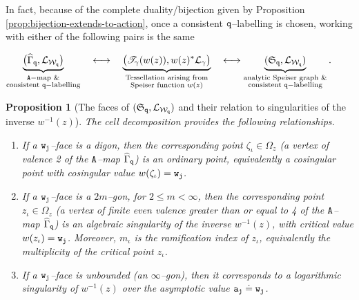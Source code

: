 \documentclass[final,3p,times]{elsarticle}
\newtheorem{proposition}[theorem]{Proposition}
\theoremstyle{definition}
\begin{document}
In fact, because of the complete duality/bijection 
given by Proposition \ref{prop:bijection-extends-to-action},
once a consistent $\tt q$--labelling is chosen, working with either of the following  pairs is the same

\centerline{$
\underbrace{
\big( %
\widehat{\Gamma}_{\tt q}, %
\mathcal{L}_{\mathcal{W}_{\tt q}} \big) 
}_{\substack{ \tt A-\text{map \&} \\ 
\text{consistent }{\tt q}-\text{labelling} } } 
\quad
\longleftrightarrow 
\quad
\underbrace{
\big( \mathscr{T}_\gamma(w(z)), 
w(z)^*\mathcal{L}_\gamma \big)
}_{\substack{ \text{Tessellation arising from} \\
\text{Speiser function } w(z) }}
\quad
\longleftrightarrow 
\underbrace{
(\mathfrak{S}_{\tt q}, \mathcal{L}_{\mathcal{W}_{\tt q}} ) 
}_{\substack{ \text{analytic Speiser graph } \& \\
\text{consistent }{\tt q}-\text{labelling} } } .
$}


\begin{proposition}[The faces of  
$(\mathfrak{S}_{\tt q}, \mathcal{L}_{\mathcal{W}_{\tt q}} )$ 
and 
their relation to singularities of the inverse  $w^{-1}(z)$]
\label{prop:speiser-graph-implies-speiser-function}
The cell decomposition provides the following relationships.

\begin{enumerate}[label=\arabic*),leftmargin=*]
\item
If a ${\tt w}_{\tt j}$--face is a digon, 
then 
the corresponding point $\zeta_\iota \in \Omega_z$ 
(a vertex of valence 2 of the $\tt A$--map
$\widehat{\Gamma}_{\tt q}$)
is an ordinary point,
equivalently a cosingular point 
with cosingular value $w(\zeta_\iota)={\tt w}_{\tt j}$. 

\item
If a ${\tt w}_{\tt j}$--face is a $2m$--gon, for $2 \leq m < \infty$,
then the corresponding point $z_\iota \in \Omega_z$ 
(a vertex of finite even valence greater than or equal to 4 of 
the $\tt A$--map $\widehat{\Gamma}_{\tt q}$)
is an algebraic singularity of the inverse 
$w^{-1}(z)$, with critical value $w(z_\iota)={\tt w}_{\tt j}$.
Moreover, $m_\iota$ is the ramification index of $z_\iota$, 
equivalently the multiplicity of the critical point $z_\iota$.


\item 
If a ${\tt w}_{\tt j}$--face is unbounded 
(an $\infty$--gon), then it 
corresponds to  a  logarithmic
singularity of $w^{-1}(z)$ over the asymptotic value 
${\tt a}_{\tt j} \doteq {\tt w}_{\tt j}$.
\end{enumerate}

\end{proposition}
\end{document}
